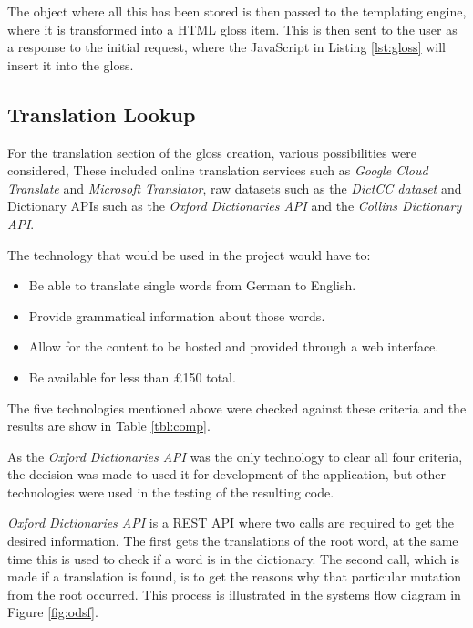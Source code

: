 The object where all this has been stored is then passed to the templating engine, where it is transformed into a HTML gloss item. This is then sent to the user as a response to the initial request, where the JavaScript in Listing \ref{lst:gloss} will insert it into the gloss. 

\subsection{Translation Lookup}

For the translation section of the gloss creation, various possibilities were considered, These included online translation services such as \textit{Google Cloud Translate} and \textit{Microsoft Translator}, raw datasets such as the \textit{DictCC dataset} and Dictionary APIs such as the \textit{Oxford Dictionaries API} and the \textit{Collins Dictionary API}. 

The technology that would be used in the project would have to:
\begin{itemize}
\item Be able to translate single words from German to English.
\item Provide grammatical information about those words.
\item Allow for the content to be hosted and provided through a web interface.
\item Be available for less than \pounds150 total.
\end{itemize}

The five technologies mentioned above were checked against these criteria and the results are show in Table \ref{tbl:comp}.



As the \textit{Oxford Dictionaries API} was the only technology to clear all four criteria, the decision was made to used it for development of the application, but other technologies were used in the testing of the resulting code.

\textit{Oxford Dictionaries API} is a REST API where two calls are required to get the desired information. The first gets the translations of the root word, at the same time this is used to check if a word is in the dictionary. The second call, which is made if a translation is found, is to get the reasons why that particular mutation from the root occurred. This process is illustrated in the systems flow diagram in Figure \ref{fig:odsf}.



